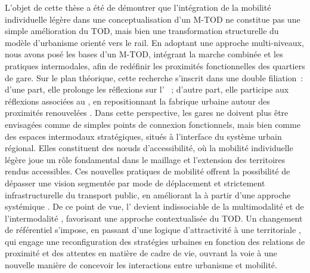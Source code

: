 \begin{refsegment}
L’objet de cette thèse a été de démontrer que l’intégration de la mobilité individuelle légère dans une conceptualisation d'un \acrfull{M-TOD} ne constitue pas une simple amélioration du \acrfull{TOD}, mais bien une transformation structurelle du modèle d’urbanisme orienté vers le rail. En adoptant une approche multi-niveaux, nous avons posé les bases d’un \acrshort{M-TOD}, intégrant la marche combinée et les pratiques intermodales, afin de redéfinir les proximités fonctionnelles des quartiers de gare. Sur le plan théorique, cette recherche s’inscrit dans une double filiation~: d’une part, elle prolonge les réflexions sur l’ \textcolor{blue}{\autocite[]{dupuy_urbanisme_1991}}~; d’autre part, elle participe aux réflexions associées au , en repositionnant la fabrique urbaine autour des proximités renouvelées \textcolor{blue}{\autocites{sheller_new_2006}[8]{sheller_mobilizing_2016}[13]{randell_no_2020}}. Dans cette perspective, les gares ne doivent plus être envisagées comme de simples points de connexion fonctionnels, mais bien comme des espaces intermodaux stratégiques, situés à l’interface du système urbain régional. Elles constituent des nœuds d’accessibilité, où la mobilité individuelle légère joue un rôle fondamental dans le maillage et l’extension des territoires rendus accessibles. Ces nouvelles pratiques de mobilité offrent la possibilité de dépasser une vision segmentée par mode de déplacement et strictement infrastructurelle du transport public, en améliorant la  \textcolor{blue}{\autocite[15]{richer_quelles_2016}} à partir d'une approche systémique . De ce point de vue, l’ devient indissociable de la \gls{multimodalité} et de l’intermodalité \textcolor{blue}{\autocite[91-92]{vincent-geslin__2012}}, favorisant une approche contextualisée du \acrshort{TOD}. Un changement de référentiel s’impose, en passant d'une logique d'attractivité à une  territoriale \textcolor{blue}{\autocite[2]{talandier_lhospitalite_2023}}, qui engage une reconfiguration des stratégies urbaines en fonction des relations de proximité et des attentes en matière de cadre de vie, ouvrant la voie à une nouvelle manière de concevoir les interactions entre urbanisme et mobilité.%


\end{refsegment}
